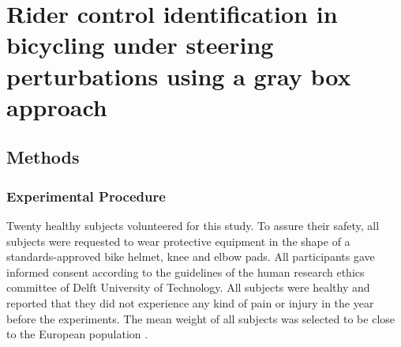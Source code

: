 \chapter{Rider control identification in bicycling under steering perturbations using a gray box approach} \label{ch:4}
 
\section{Methods}
 
\subsection{Experimental Procedure}
 
Twenty healthy subjects volunteered for this study. To assure their safety, all subjects were requested to wear protective equipment in the shape of a standards-approved bike helmet, knee and elbow pads. All participants gave informed consent according to the guidelines of the human research ethics committee of Delft University of Technology. All subjects were healthy and reported that they did not experience any kind of pain or injury in the year before the experiments. The mean weight of all subjects was selected to be close to the European population \cite{walpole2012weight}.
 
